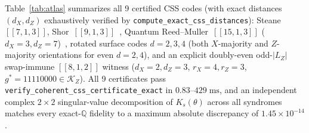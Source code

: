 \documentclass[11pt,a4paper]{article}
\theoremstyle{plain}
\theoremstyle{definition}
\newcommand{\Q}{\mathbb{Q}}
\newcommand{\KZ}{\mathcal{K}_Z}
\begin{document}
Table~\ref{tab:atlas} summarizes all 9 certified CSS codes (with exact distances $(d_X, d_Z)$ exhaustively verified by \texttt{compute\_exact\_css\_distances}): Steane~$[[7,1,3]]$, Shor~$[[9,1,3]]$~\cite{Shor1995Scheme}, Quantum Reed--Muller~$[[15,1,3]]$ ($d_X=3, d_Z=7$)~\cite{Bravyi2005Universal}, rotated surface codes $d=2,3,4$ (both $X$-majority and $Z$-majority orientations for even $d=2,4$), and an explicit doubly-even odd-$|L_Z|$ swap-immune $[[8,1,2]]$ witness ($d_X=2, d_Z=3$, $r_X=4, r_Z=3$, $g^* = 11110000 \in \KZ$). All 9 certificates pass \texttt{verify\_\allowbreak coherent\_\allowbreak css\_\allowbreak certificate\_\allowbreak exact} in $0.83\text{--}429\;\mathrm{ms}$, and an independent complex $2\times 2$ singular-value decomposition of $K_s(\theta)$ across all syndromes matches every exact-$\Q$ fidelity to a maximum absolute discrepancy of $1.45\times 10^{-14}$.
\end{document}
